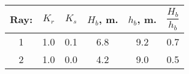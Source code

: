 \begin{tabular}{cccccc}
Ray: & $K_{r}$ & $K_{s}$ & $H_{b}$, m. & $h_{b}$, m. & $\dfrac{H_{b}}{h_{b}}$ \\
\hline
1 & 1.0 & 0.1 & 6.8 & 9.2 & 0.7 \\
2 & 1.0 & 0.0 & 4.2 & 9.0 & 0.5 \\
\hline
\end{tabular}
